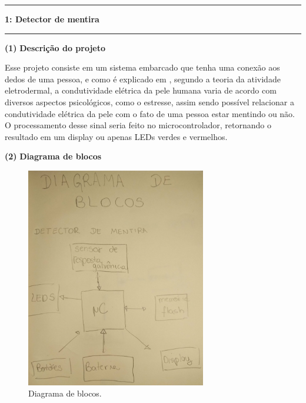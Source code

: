 \documentclass[11pt]{article}
\newcommand\question[2]{\vspace{.25in}\hrule\textbf{#1: #2}\vspace{.5em}\hrule\vspace{.10in}}
\renewcommand\part[1]{\vspace{.10in}\textbf{(#1)}}
\newcommand\descricao{\vspace{.10in}\textbf{Descrição do projeto }}
\newcommand\diagrama{\vspace{.10in}\textbf{Diagrama de blocos }}
\begin{document}
\raggedright
\newcommand\NAME{Marcelo G de Andrade}  %
\newcommand\HWNUM{1}              %


\question{1}{Detector de mentira}

\part{1} \descricao


\RaggedRight Esse projeto consiste em um sistema embarcado que tenha uma conexão aos dedos de uma pessoa, e como é explicado em \cite{eletrodermal}, segundo a teoria da atividade eletrodermal, a condutividade elétrica da pele humana varia de acordo com diversos aspectos psicológicos, como o estresse, assim sendo possível relacionar a condutividade elétrica da pele com o fato de uma pessoa estar mentindo ou não. O processamento desse 
sinal seria feito no microcontrolador, retornando o resultado em um display ou apenas LEDs verdes e vermelhos.

\raggedright
\part{2} \diagrama

\begin{figure}[h!]
	\centering
	\includegraphics[width=0.7\textwidth]{fig1.jpg}
		\caption{Diagrama de blocos.}
\end{figure}
\end{document}
